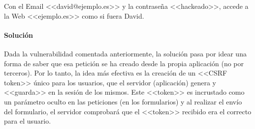 \begin{tcolorbox}[colback=red!5!white,colframe=red!75!black,title=Atacante]

Con el Email <<david@ejemplo.es>> y la contraseña <<hackeado>>, accede a la Web
<<ejemplo.es>> como si fuera David.

\end{tcolorbox}

\paragraph{Solución} Dada la vulnerabilidad comentada anteriormente, la solución pasa por idear una
forma de saber que esa petición se ha creado desde la propia aplicación (no por
terceros). Por lo tanto, la idea más efectiva es la creación de un <<CSRF
token>> único para los usuarios, que el servidor (aplicación) genera y
<<guarda>> en la sesión de los mismos. Este <<token>> es incrustado como un
parámetro oculto en las peticiones (en los formularios) y al realizar el envío
del formulario, el servidor comprobará que el <<token>> recibido era el correcto
para el usuario.

